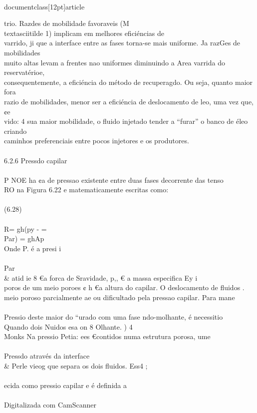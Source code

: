 \\documentclass[12pt]{article}
\begin{document}
trio. Razdes de mobilidade favoraveis (M \\textasciitilde{} 1) implicam em melhores eficiéncias de\\
varrido, ji que a interface entre as fases torna-se mais uniforme. Ja razGes de mobilidades\\
muito altas levam a frentes nao uniformes diminuindo a Area varrida do reservatérioe,\\
consequentemente, a eficiéncia do método de recuperagdo. Ou seja, quanto maior fora\\
razio de mobilidades, menor ser a eficiéncia de deslocamento de leo, uma vez que, ¢e\\
vido: 4 sua maior mobilidade, o fluido injetado tender a “furar” o banco de éleo criando\\
caminhos preferenciais entre pocos injetores e os produtores.\\
\\
6.2.6 Pressdo capilar\\
\\
P NOE ha ¢a de pressao existente entre duas fases decorrente das tenso\\
RO na Figura 6.22 e matematicamente escritas como:\\
\\
(6.28)\\
\\
R= gh(py - =\\
Par) = ghAp\\
Onde P. é a presi i\\
\\
Par \\& atid ie 8 €a forca de Sravidade, p,, € a massa especifica Ey i\\
poros de um meio poroes ¢ h €a altura do capilar. O deslocamento de fluidos .\\
meio poroso parcialmente ae ou dificultado pela pressao capilar. Para mane\\
\\
Pressio deste maior do “urado com uma fase ndo-molhante, é necessitio\\
Quando dois Nuidos esa on 8 Olhante. ) 4\\
Monks Na pressio Petia: ees €contidos numa estrutura porosa, ume\\
\\
Pressdo através da interface \\& Perle vieog que separa os dois fluidos. Ess4 ;\\
\\
ecida como pressio capilar e é definida a\\
\\
Digitalizada com CamScanner\\
\end{document}
